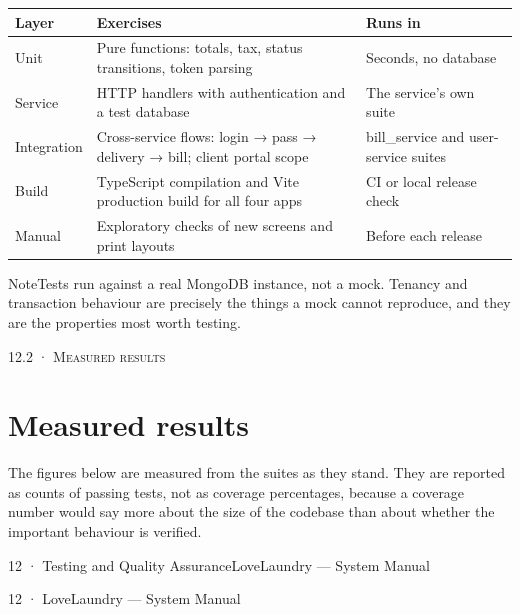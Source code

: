 \documentclass[11pt,a4paper,oneside]{book}
\begin{document}
\begin{center}\small
\begin{tabularx}{\linewidth}{|X|X|X|}
\hline
\rowcolor{lightgrey}
\textbf{Layer} & \textbf{Exercises} & \textbf{Runs in} \\ \hline
Unit & Pure functions: totals, tax, status transitions, token parsing & Seconds, no database \\ \hline
Service & HTTP handlers with authentication and a test database & The service's own suite \\ \hline
Integration & Cross-service flows: login → pass → delivery → bill; client portal scope & bill\_service and user-service suites \\ \hline
Build & TypeScript compilation and Vite production build for all four apps & CI or local release check \\ \hline
Manual & Exploratory checks of new screens and print layouts & Before each release \\ \hline
\end{tabularx}
\end{center}
\begin{notebox}NoteTests run against a real MongoDB instance, not a mock. Tenancy and transaction behaviour are precisely the things a mock cannot reproduce, and they are the properties most worth testing.\end{notebox}
\textsc{\small\color{crimson}12.2 · Measured results}\par\medskip
\section*{Measured results}
The figures below are measured from the suites as they stand. They are reported as counts of passing tests, not as coverage percentages, because a coverage number would say more about the size of the codebase than about whether the important behaviour is verified.

12 · Testing and Quality AssuranceLoveLaundry — System Manual

12 · LoveLaundry — System Manual
\end{document}
